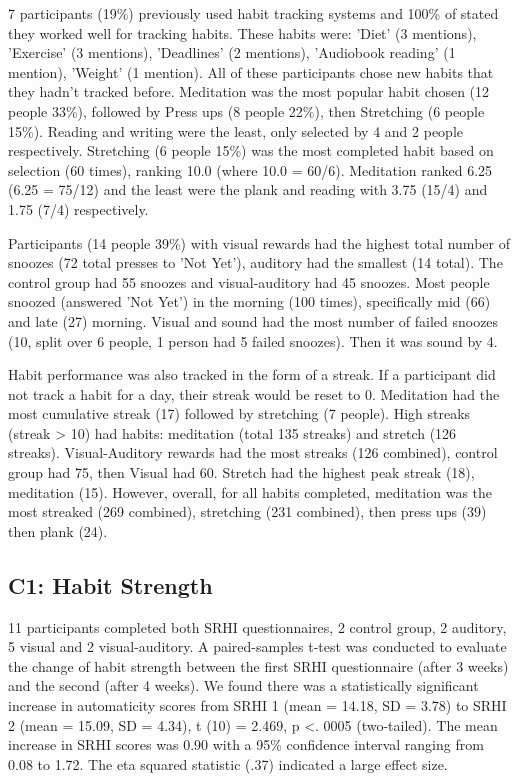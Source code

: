 \documentclass{scaffold/sigchi}
\begin{document}
7 participants (19\%) previously used habit tracking systems and 100\% of stated they worked well for tracking habits. These habits were: 'Diet' (3 mentions), 'Exercise' (3 mentions), 'Deadlines' (2 mentions), 'Audiobook reading' (1 mention), 'Weight' (1 mention). All of these participants chose new habits that they hadn't tracked before. Meditation was the most popular habit chosen (12 people 33\%), followed by Press ups (8 people 22\%), then Stretching (6 people 15\%). Reading and writing were the least, only selected by 4 and 2 people respectively. Stretching (6 people 15\%) was the most completed habit based on selection (60 times), ranking 10.0 (where 10.0 = 60/6). Meditation ranked 6.25 (6.25 = 75/12) and the least were the plank and reading with 3.75 (15/4) and 1.75 (7/4) respectively.


Participants (14 people 39\%) with visual rewards had the highest total number of snoozes (72 total presses to 'Not Yet'), auditory had the smallest (14 total). The control group had 55 snoozes and visual-auditory had 45 snoozes. Most people snoozed (answered 'Not Yet') in the morning (100 times), specifically mid (66) and late (27) morning. Visual and sound had the most number of failed snoozes (10, split over 6 people, 1 person had 5 failed snoozes). Then it was sound by 4.


Habit performance was also tracked in the form of a streak. If a participant did not track a habit for a day, their streak would be reset to 0. Meditation had the most cumulative streak (17) followed by stretching (7 people). High streaks (streak > 10) had habits: meditation (total 135 streaks) and stretch (126 streaks). Visual-Auditory rewards had the most streaks (126 combined), control group had 75, then Visual had 60. Stretch had the highest peak streak (18), meditation (15). However, overall, for all habits completed, meditation was the most streaked (269 combined), stretching (231 combined), then press ups (39) then plank (24).

\subsection{C1: Habit Strength}
11 participants completed both SRHI questionnaires, 2 control group, 2 auditory, 5 visual and 2 visual-auditory. A paired-samples t-test was conducted to evaluate the change of habit strength between the first SRHI questionnaire (after 3 weeks) and the second (after 4 weeks). We found there was a statistically significant increase in automaticity scores from SRHI 1 (mean = 14.18, SD = 3.78) to SRHI 2 (mean = 15.09, SD = 4.34), t (10) = 2.469, p <. 0005 (two-tailed). The mean increase in SRHI scores was 0.90 with a 95\% confidence interval ranging from 0.08 to 1.72. The eta squared statistic (.37) indicated a large effect size.
\end{document}
